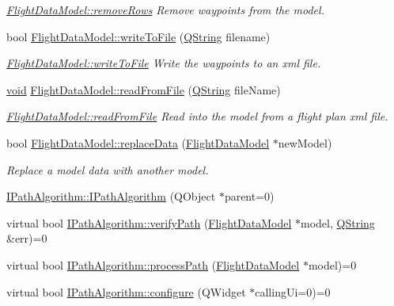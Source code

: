 \begin{DoxyCompactItemize}
\begin{DoxyCompactList}\small\item\em \hyperlink{group___path_ga951208986321a56cc67eafa5a9d67f0e}{\-Flight\-Data\-Model\-::remove\-Rows} \-Remove waypoints from the model. \end{DoxyCompactList}\item 
bool \hyperlink{group___path_gae8b76411094a9ad3164eab0996436da6}{\-Flight\-Data\-Model\-::write\-To\-File} (\hyperlink{group___u_a_v_objects_plugin_gab9d252f49c333c94a72f97ce3105a32d}{\-Q\-String} filename)
\begin{DoxyCompactList}\small\item\em \hyperlink{group___path_gae8b76411094a9ad3164eab0996436da6}{\-Flight\-Data\-Model\-::write\-To\-File} \-Write the waypoints to an xml file. \end{DoxyCompactList}\item 
\hyperlink{group___u_a_v_objects_plugin_ga444cf2ff3f0ecbe028adce838d373f5c}{void} \hyperlink{group___path_ga39997b5fd9d9720f2798e2c1a18b8171}{\-Flight\-Data\-Model\-::read\-From\-File} (\hyperlink{group___u_a_v_objects_plugin_gab9d252f49c333c94a72f97ce3105a32d}{\-Q\-String} file\-Name)
\begin{DoxyCompactList}\small\item\em \hyperlink{group___path_ga39997b5fd9d9720f2798e2c1a18b8171}{\-Flight\-Data\-Model\-::read\-From\-File} \-Read into the model from a flight plan xml file. \end{DoxyCompactList}\item 
bool \hyperlink{group___path_ga59cab53123301865b4604e97e13e1ce0}{\-Flight\-Data\-Model\-::replace\-Data} (\hyperlink{class_flight_data_model}{\-Flight\-Data\-Model} $\ast$new\-Model)
\begin{DoxyCompactList}\small\item\em \-Replace a model data with another model. \end{DoxyCompactList}\item 
\hyperlink{group___path_gafe016f55fde1369cf1d9301f86b37c2a}{\-I\-Path\-Algorithm\-::\-I\-Path\-Algorithm} (\-Q\-Object $\ast$parent=0)
\item 
virtual bool \hyperlink{group___path_ga115e5e8fbbb0f1e2a1208be63bafdb5e}{\-I\-Path\-Algorithm\-::verify\-Path} (\hyperlink{class_flight_data_model}{\-Flight\-Data\-Model} $\ast$model, \hyperlink{group___u_a_v_objects_plugin_gab9d252f49c333c94a72f97ce3105a32d}{\-Q\-String} \&err)=0
\item 
virtual bool \hyperlink{group___path_ga7c93a036e8d5904a4c76444e38ec96b9}{\-I\-Path\-Algorithm\-::process\-Path} (\hyperlink{class_flight_data_model}{\-Flight\-Data\-Model} $\ast$model)=0
\item 
virtual bool \hyperlink{group___path_ga4157a802d06807c33e402f6a51f9f366}{\-I\-Path\-Algorithm\-::configure} (\-Q\-Widget $\ast$calling\-Ui=0)=0
\end{DoxyCompactItemize}
